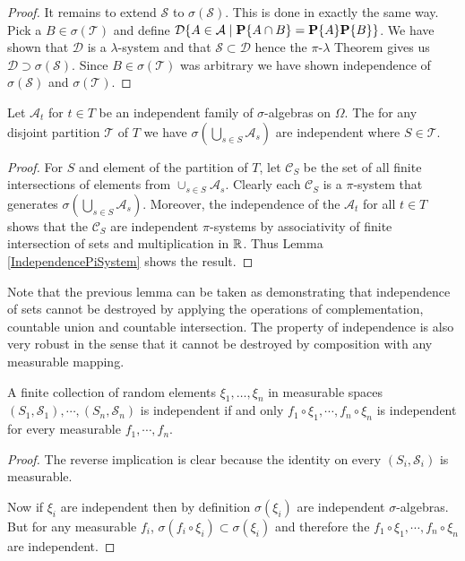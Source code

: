 \begin{proof}
It remains to extend $\mathcal{S}$ to $\sigma(\mathcal{S})$.  This is
done in exactly the same way.   Pick a $B \in \sigma(\mathcal{T})$ and define $\mathcal{D} \lbrace A \in
  \mathcal{A} \mid  \textbf{P}\{A \cap B\} =  \textbf{P}\{A\}
  \textbf{P}\{B\} \rbrace$.  We have shown that  $\mathcal{D}$ is a
  $\lambda$-system and that $\mathcal{S} \subset \mathcal{D}$ hence
  the $\pi$-$\lambda$ Theorem gives us $\mathcal{D} \supset
  \sigma(\mathcal{S})$.  Since $B\in \sigma(\mathcal{T})$ was
  arbitrary we have shown independence of $\sigma(\mathcal{S})$ and $\sigma(\mathcal{T})$.
\end{proof}

\begin{lem}\label{IndependenceGrouping}Let $\mathcal{A}_t$ for $t \in
  T$ be an independent family of $\sigma$-algebras on $\Omega$.  The
  for any disjoint partition $\mathcal{T}$ of $T$ we have
  $\sigma(\bigcup_{s \in S} \mathcal{A}_s)$ are independent where $S
  \in \mathcal{T}$.
\end{lem}
\begin{proof}
For $S$ and element of the partition of $T$, let $\mathcal{C}_S$ be
the set of all finite intersections of elements from $\cup_{s \in S}
\mathcal{A}_s$.  Clearly each $\mathcal{C}_S$ is a $\pi$-system that
generates $\sigma (\bigcup_{s \in S} \mathcal{A}_s)$.  Moreover,
the independence of the $\mathcal{A}_t$ for all $t \in T$ shows that
the $\mathcal{C}_S$ are independent $\pi$-systems by
associativity of finite intersection of sets and multiplication in $\mathbb{R}$.
Thus Lemma \ref{IndependencePiSystem} shows the result.
\end{proof}

Note that the previous lemma can be taken as demonstrating that
independence of sets cannot be destroyed by applying the operations of
complementation, countable union and countable intersection.  The
property of independence is also very robust in the sense that it
cannot be destroyed by composition with any measurable mapping.
\begin{lem}\label{IndependenceComposition}A
  finite collection of random elements $\xi_1, \dots, \xi_n$ in
  measurable spaces $(S_1,\mathcal{S}_1), \cdots, (S_n,
  \mathcal{S}_n)$ is independent if and only $f_1 \circ \xi_1, \cdots,
  f_n \circ \xi_n$ is independent for every measurable $f_1, \cdots, f_n$.
\end{lem}
\begin{proof}The reverse implication is clear because the identity on
  every $(S_i, \mathcal{S}_i)$ is measurable.

Now if $\xi_i$ are independent then by definition $\sigma(\xi_i)$ are
independent $\sigma$-algebras.  But for any measurable $f_i$, $\sigma(f_i \circ \xi_i) \subset
\sigma(\xi_i)$ and therefore the $f_1 \circ \xi_1, \cdots,
  f_n \circ \xi_n$ are independent.
\end{proof}

